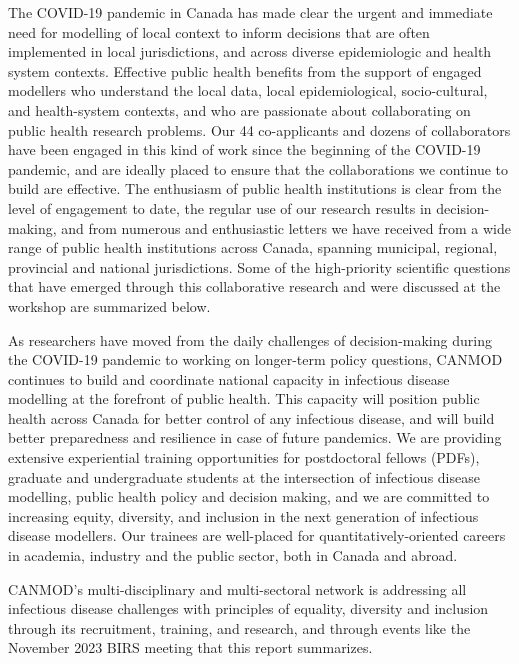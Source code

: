 The
COVID-19 pandemic in Canada has made clear the urgent and immediate
need for modelling of local context to inform decisions that are often
implemented in local jurisdictions, and across diverse epidemiologic
and health system contexts. Effective public health benefits from the
support of engaged modellers who understand the local data, local
epidemiological, socio-cultural, and health-system contexts, and who
are passionate about collaborating on public health research
problems. Our 44 co-applicants and dozens of collaborators have been
engaged in this kind of work since the beginning of the COVID-19
pandemic, and are ideally placed to ensure that the collaborations we
continue to build are effective. The enthusiasm of public health
institutions is clear from the level of engagement to date, the
regular use of our research results in decision-making, and from
numerous and enthusiastic letters we have received from a wide range
of public health institutions across Canada, spanning municipal,
regional, provincial and national jurisdictions. Some of the
high-priority scientific questions that have emerged through this
collaborative research and were discussed at the workshop
are summarized below.


As researchers have moved from the daily challenges of
decision-making during the COVID-19 pandemic to working on longer-term
policy questions, CANMOD continues to build and coordinate national
capacity in infectious disease modelling at the forefront of public
health. This capacity will position public health across Canada for
better control of any infectious disease, and will build better
preparedness and resilience in case of future pandemics. We are providing extensive experiential training opportunities for
postdoctoral fellows (PDFs), graduate and undergraduate students at
the intersection of infectious disease modelling, public health policy
and decision making, and we are committed to increasing equity,
diversity, and inclusion in the next generation of infectious disease
modellers. Our trainees are well-placed for quantitatively-oriented
careers in academia, industry and the public sector, both in Canada
and abroad.


CANMOD’s multi-disciplinary and multi-sectoral network is addressing
all infectious disease challenges with principles of equality,
diversity and inclusion through its recruitment, training, and
research, and through events like the November 2023 BIRS meeting that
this report summarizes.
